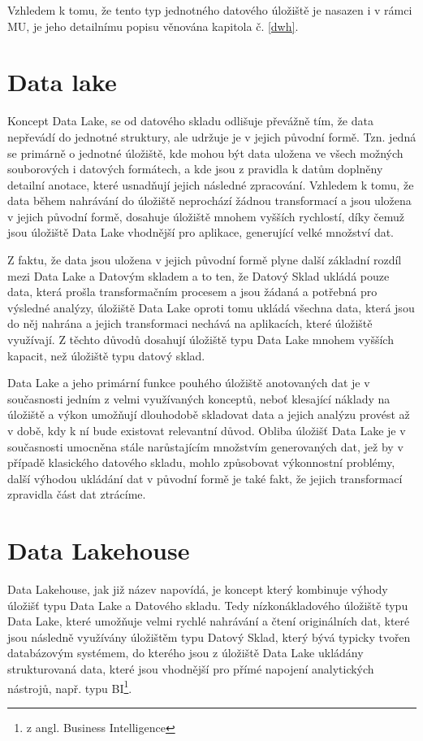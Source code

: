 \documentclass[
  digital,     %
  twoside,     %
  lof,         %
  lot,         %
]{fithesis4}
\begin{document}
Vzhledem k tomu, že tento typ jednotného datového úložiště je nasazen i v rámci MU, je jeho detailnímu popisu věnována kapitola č.  \ref{dwh}.

\section{Data lake}
Koncept Data Lake, se od datového skladu odlišuje převážně tím, že data nepřevádí do jednotné struktury, ale udržuje je v jejich původní formě. Tzn. jedná se primárně o jednotné úložiště, kde mohou být data uložena ve všech možných souborových i datových formátech, a kde jsou z pravidla k datům doplněny detailní anotace, které usnadňují jejich následné zpracování.\parencite{Foote19042018} Vzhledem k tomu, že data během nahrávání do úložiště neprochází žádnou transformací a jsou uložena v jejich původní formě, dosahuje úložiště mnohem vyšších rychlostí, díky čemuž jsou úložiště Data Lake vhodnější pro aplikace, generující velké množství dat.\parencite[s.~1]{Harby20221217}

Z faktu, že data jsou uložena v jejich původní formě plyne další základní rozdíl mezi Data Lake a Datovým skladem a to ten, že Datový Sklad ukládá pouze data, která prošla transformačním procesem a jsou žádaná a potřebná pro výsledné analýzy, úložiště Data Lake oproti tomu ukládá všechna data, která jsou do něj nahrána a jejich transformaci nechává na aplikacích, které úložiště využívají. Z těchto důvodů dosahují úložiště typu Data Lake mnohem vyšších kapacit, než úložiště typu datový sklad.\parencite[s.~4]{Nambiar2022} 

Data Lake a jeho primární funkce pouhého úložiště anotovaných dat je v současnosti jedním z velmi využívaných konceptů, neboť klesající náklady na úložiště a výkon umožňují dlouhodobě skladovat data a jejich analýzu provést až v době, kdy k ní bude existovat relevantní důvod. Obliba úložišť Data Lake je v současnosti umocněna stále narůstajícím množstvím generovaných dat, jež by v případě klasického datového skladu, mohlo způsobovat výkonnostní problémy, další výhodou ukládání dat v původní formě je také fakt, že jejich transformací zpravidla část dat ztrácíme.\parencite[s.~ 5]{Nambiar2022}

\section{Data Lakehouse}
Data Lakehouse, jak již název napovídá, je koncept který kombinuje výhody úložišť typu Data Lake a Datového skladu. Tedy nízkonákladového úložiště typu Data Lake, které umožňuje velmi rychlé nahrávání a čtení originálních dat, které jsou následně využívány úložištěm typu Datový Sklad, který bývá typicky tvořen databázovým systémem, do kterého jsou z úložiště Data Lake ukládány strukturovaná data, které jsou vhodnější pro přímé napojení analytických nástrojů, např. typu BI\footnote{z angl. Business Intelligence}.\parencite[s.~3]{Harby20221217}
\end{document}
